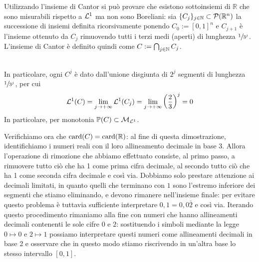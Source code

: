 \begin{remark} Utilizzando l'insieme di Cantor si può provare che esistono sottoinsiemi di $\mathbb{R}$ che sono misurabili rispetto a $\mathcal{L}^{1}$ ma non sono Boreliani: sia $\{C_j\}_{j \in \mathbb{N}} \subset \mathcal{P}(\mathbb{R}^n)$ la successione di insiemi definita ricorsivamente ponendo $C_0 := [0, 1]^n$ e $C_{j+1}$ è l'insieme ottenuto da $C_j$ rimuovendo tutti i terzi medi (aperti) di lunghezza $\sfrac{1}{3^j}$. L'insieme di Cantor è definito quindi come $C := \bigcap_{j \in \mathbb{N}} C_j$. \\
  \\
  In particolare, ogni $C^j$ è dato dall'unione disgiunta di $2^j$ segmenti di lunghezza $\sfrac{1}{3^j}$, per cui 
  \[\mathcal{L}^1(C) = \lim_{j\to +\infty} \mathcal{L}^1 (C_j) = \lim_{j\to +\infty} \left( \frac{2}{3} \right)^j = 0\]
  In particolare, per monotonia $\mathbb{P}(C)\subset \mathcal{M}_{\mathcal{L}^1}$. 

  Verifichiamo ora che $\operatorname{card}( C )= \operatorname{card}(\mathbb{R})$: al fine di questa dimostrazione, identifichiamo i numeri reali con il loro allineamento decimale in base 3. Allora l'operazione di rimozione che abbiamo effettuato consiste, al primo passo, a rimuovere tutto ciò che ha 1 come prima cifra decimale, al secondo tutto ciò che ha 1 come seconda cifra decimale e così via. Dobbiamo solo prestare attenzione ai decimali limitati, in quanto quelli che terminano con $1$ sono l'estremo inferiore dei segmenti che stiamo eliminando, e devono rimanere nell'insieme finale: per evitare questo problema è tuttavia sufficiente interpretare $0,1 = 0,0\bar{2}$ e così via. Iterando questo procedimento rimaniamo alla fine con numeri che hanno allineamenti decimali contenenti le sole cifre $0$ e $2$: sostituendo i simboli mediante la legge $0\mapsto 0$ e $2\mapsto 1$ possiamo interpretare questi numeri come allineamenti decimali in base 2 e osservare che in questo modo stiamo riscrivendo in un'altra base lo stesso intervallo $[0,1]$.


\end{remark}
